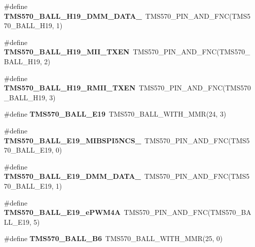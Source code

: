 \begin{DoxyCompactItemize}
\#define {\bfseries T\+M\+S570\+\_\+\+B\+A\+L\+L\+\_\+\+H19\+\_\+\+D\+M\+M\+\_\+\+D\+A\+T\+A\+\_}~T\+M\+S570\+\_\+\+P\+I\+N\+\_\+\+A\+N\+D\+\_\+\+F\+NC(T\+M\+S570\+\_\+\+B\+A\+L\+L\+\_\+\+H19, 1)
\item 
\mbox{\label{tms570lc4357-pins_8h_a815cc1e0f301f8847457fdc58bf2e613}} 
\#define {\bfseries T\+M\+S570\+\_\+\+B\+A\+L\+L\+\_\+\+H19\+\_\+\+M\+I\+I\+\_\+\+T\+X\+EN}~T\+M\+S570\+\_\+\+P\+I\+N\+\_\+\+A\+N\+D\+\_\+\+F\+NC(T\+M\+S570\+\_\+\+B\+A\+L\+L\+\_\+\+H19, 2)
\item 
\mbox{\label{tms570lc4357-pins_8h_a8157acdeb684c3468e6c738eac416d34}} 
\#define {\bfseries T\+M\+S570\+\_\+\+B\+A\+L\+L\+\_\+\+H19\+\_\+\+R\+M\+I\+I\+\_\+\+T\+X\+EN}~T\+M\+S570\+\_\+\+P\+I\+N\+\_\+\+A\+N\+D\+\_\+\+F\+NC(T\+M\+S570\+\_\+\+B\+A\+L\+L\+\_\+\+H19, 3)
\item 
\mbox{\label{tms570lc4357-pins_8h_a3c5317e9c1f0b7d90e3edaadf9f670f1}} 
\#define {\bfseries T\+M\+S570\+\_\+\+B\+A\+L\+L\+\_\+\+E19}~T\+M\+S570\+\_\+\+B\+A\+L\+L\+\_\+\+W\+I\+T\+H\+\_\+\+M\+MR(24, 3)
\item 
\mbox{\label{tms570lc4357-pins_8h_aae1559fb893b6358edaabcd9a0370af9}} 
\#define {\bfseries T\+M\+S570\+\_\+\+B\+A\+L\+L\+\_\+\+E19\+\_\+\+M\+I\+B\+S\+P\+I5\+N\+C\+S\+\_}~T\+M\+S570\+\_\+\+P\+I\+N\+\_\+\+A\+N\+D\+\_\+\+F\+NC(T\+M\+S570\+\_\+\+B\+A\+L\+L\+\_\+\+E19, 0)
\item 
\mbox{\label{tms570lc4357-pins_8h_a7e62de5177e0559d3c63edeaaa8f1ce6}} 
\#define {\bfseries T\+M\+S570\+\_\+\+B\+A\+L\+L\+\_\+\+E19\+\_\+\+D\+M\+M\+\_\+\+D\+A\+T\+A\+\_}~T\+M\+S570\+\_\+\+P\+I\+N\+\_\+\+A\+N\+D\+\_\+\+F\+NC(T\+M\+S570\+\_\+\+B\+A\+L\+L\+\_\+\+E19, 1)
\item 
\mbox{\label{tms570lc4357-pins_8h_afeea98d0bd1dca0269e2c299f652bf25}} 
\#define {\bfseries T\+M\+S570\+\_\+\+B\+A\+L\+L\+\_\+\+E19\+\_\+e\+P\+W\+M4A}~T\+M\+S570\+\_\+\+P\+I\+N\+\_\+\+A\+N\+D\+\_\+\+F\+NC(T\+M\+S570\+\_\+\+B\+A\+L\+L\+\_\+\+E19, 5)
\item 
\mbox{\label{tms570lc4357-pins_8h_af8d7d3275def41f47a005dca421ddb7b}} 
\#define {\bfseries T\+M\+S570\+\_\+\+B\+A\+L\+L\+\_\+\+B6}~T\+M\+S570\+\_\+\+B\+A\+L\+L\+\_\+\+W\+I\+T\+H\+\_\+\+M\+MR(25, 0)

\end{DoxyCompactItemize}
